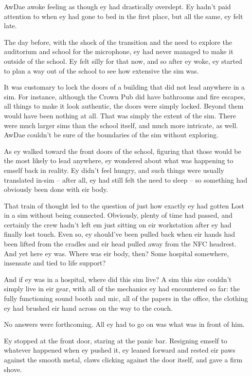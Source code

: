 AwDae awoke feeling as though ey had drastically overslept.  Ey hadn't paid attention to when ey had gone to bed in the first place, but all the same, ey felt late.

The day before, with the shock of the transition and the need to explore the auditorium and school for the microphone, ey had never managed to make it outside of the school.  Ey felt silly for that now, and so after ey woke, ey started to plan a way out of the school to see how extensive the sim was.

It was customary to lock the doors of a building that did not lead anywhere in a sim.  For instance, although the Crown Pub did have bathrooms and fire escapes, all things to make it look authentic, the doors were simply locked.  Beyond them would have been nothing at all.  That was simply the extent of the sim.  There were much larger sims than the school itself, and much more intricate, as well.  AwDae couldn't be sure of the boundaries of the sim without exploring.

As ey walked toward the front doors of the school, figuring that those would be the most likely to lead anywhere, ey wondered about what was happening to emself back in reality.  Ey didn't feel hungry, and such things were usually translated in-sim -- after all, ey had still felt the need to sleep -- so something had obviously been done with eir body.

That train of thought led to the question of just how exactly ey had gotten Lost in a sim without being connected.  Obviously, plenty of time had passed, and certainly the crew hadn't left em just sitting on eir workstation after ey had finally lost touch.  Even so, ey should've been pulled back when eir hands had been lifted from the cradles and eir head pulled away from the NFC headrest.  And yet here ey was.  Where was eir body, then?  Some hospital somewhere, insensate and tied to life support?

And if ey was in a hospital, where did this sim live?  A sim this size couldn't simply live in eir gear, with all of the mechanics ey had encountered so far: the fully functioning sound booth and mic, all of the papers in the office, the clothing ey had brushed eir hand across on the way to the couch.

No answers were forthcoming.  All ey had to go on was what was in front of him.

Ey stopped at the front door, staring at the panic bar.  Resigning emself to whatever happened when ey pushed it, ey leaned forward and rested eir paws against the smooth metal, claws clicking against the door itself, and gave a firm shove.

